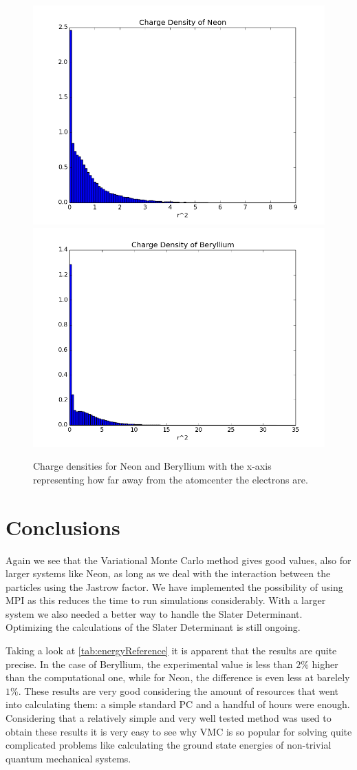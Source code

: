 \documentclass[11pt]{article}
\begin{document}
		\begin{figure}
			\centering \includegraphics[width=0.45\linewidth]{figures/ChargeDensityNeon}
			\centering \includegraphics[width=0.45\linewidth]{figures/ChargeDensityBeryllium}
			\protect\caption{Charge densities for Neon and Beryllium with the x-axis representing how far away from the atomcenter the electrons are. }
			\label{fig:charge_density}
		\end{figure}

\section{Conclusions}
	Again we see that the Variational Monte Carlo method gives good values, also for larger systems like Neon, as long as we deal with the interaction between the particles using the Jastrow factor. We have implemented the possibility of using MPI as this reduces the time to run simulations considerably. With a larger system we also needed a better way to handle the Slater Determinant. Optimizing the calculations of the Slater Determinant is still ongoing.

	Taking a look at \ref{tab:energyReference} it is apparent that the results are quite precise. In the case of Beryllium, the experimental value is less than $2\%$ higher than the computational one, while for Neon, the difference is even less at barelely $1\%$. These results are very good considering the amount of resources that went into calculating them: a simple standard PC and a handful of hours were enough. Considering that a relatively simple and very well tested method was used to obtain these results it is very easy to see why VMC is so popular for solving quite complicated problems like calculating the ground state energies of non-trivial quantum mechanical systems.




\end{document}

